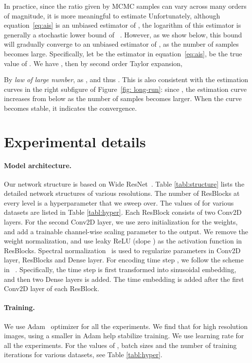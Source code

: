 \documentclass{article} \usepackage{iclr2021_conference,times}
\def\Figref#1{Figure~\ref{#1}}
\def\eqref#1{equation~\ref{#1}}
\begin{document}
In practice, since the ratio given by MCMC samples can vary across many orders of magnitude, it is more meaningful to estimate 
Unfortunately, although \eqref{eq:ais} is an unbiased estimator of , the logarithm of this estimator is generally a stochastic lower bound of ~\citep{grosse2016measuring}. However, as we show below, this bound will gradually converge to an unbiased estimator of , as the number of samples becomes large. Specifically, let  be the estimator in \eqref{eq:ais},  be the true value of . We have , then by second order Taylor expansion,

By {\em law of large number},  as , and thus . This is also consistent with the estimation curves in the right subfigure of \Figref{fig: long-run}: since , the estimation curve increases from below as the number of samples becomes larger. When the curve becomes stable, it indicates the convergence. 

\section{Experimental details} \label{app:exp}
\paragraph{Model architecture.} Our network structure is based on Wide ResNet~\citep{zagoruyko2016wide}. Table \ref{tabl:structure} lists the detailed network structures of various resolutions. The number of ResBlocks at every level  is a hyperparameter that we sweep over. The values of  for various datasets are listed in Table \ref{tabl:hyper}. Each ResBlock consists of two Conv2D layers. For the second Conv2D layer, we use zero initialization for the weights, and add a trainable channel-wise scaling parameter to the output. We remove the weight normalization, and use leaky ReLU (slope ) as the activation function in ResBlocks. Spectral normalization~\citep{miyato2018spectral} is used to regularize parameters in Conv2D layer, ResBlocks and Dense layer. For encoding time step , we follow the scheme in ~\citep{ho2020denoising}. Specifically, the time step  is first transformed into sinusoidal embedding, and then two Dense layers is added. The time embedding is added after the first Conv2D layer of each ResBlock. 

\paragraph{Training.} We use Adam~\citep{kingma2014adam} optimizer for all the experiments. We find that for high resolution images, using a smaller  in Adam help stabilize training. We use learning rate  for all the experiments. For the values of , batch sizes and the number of training iterations for various datasets, see Table \ref{tabl:hyper}. 
\end{document}
